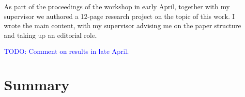 As part of the proceedings of the workshop in early April, together with my supervisor we authored a 12-page research project on the topic of this work. I wrote the main content, with my supervisor advising me on the paper structure and taking up an editorial role. 

\begin{center}
    \textcolor{blue}{TODO: Comment on results in late April.}
\end{center}


\section{Summary}
